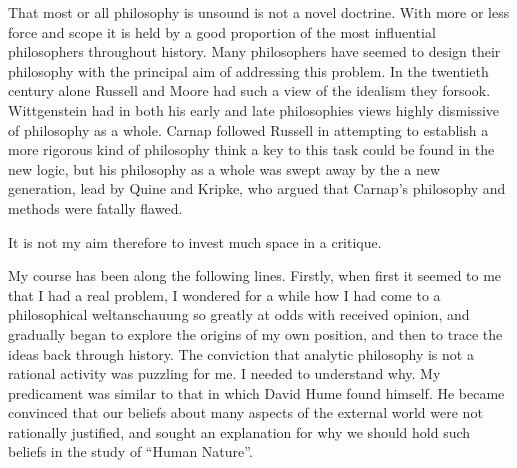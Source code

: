 That most or all philosophy is unsound is not a novel doctrine.
With more or less force and scope it is held by a good proportion of the most influential philosophers throughout history.
Many philosophers have seemed to design their philosophy with the principal aim of addressing this problem.
In the twentieth century alone Russell and Moore had such a view of the idealism they forsook.
Wittgenstein had in both his early and late philosophies views highly dismissive of philosophy as a whole.
Carnap followed Russell in attempting to establish a more rigorous kind of philosophy think a key to this task could be found in the new logic, but his philosophy as a whole was swept away by the a new generation, lead by Quine and Kripke, who argued that Carnap's philosophy and methods were fatally flawed.

It is not my aim therefore to invest much space in a critique.

My course has been along the following lines.
Firstly, when first it seemed to me that I had a real problem, I wondered for a while how I had come to a philosophical weltanschauung so greatly at odds with received opinion, and gradually began to explore the origins of my own position, and then to trace the ideas back through history.
The conviction that analytic philosophy is not a rational activity was puzzling for me.
I needed to understand why.
My predicament was similar to that in which David Hume found himself.
He became convinced that our beliefs about many aspects of the external world were not rationally justified, and sought an explanation for why we should hold such beliefs in the study of ``Human Nature''.
